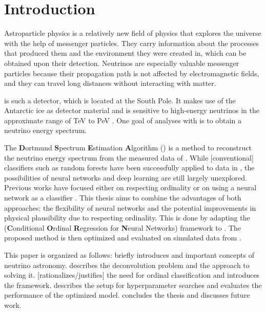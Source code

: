 \chapter{Introduction}
Astroparticle physics is a relatively new field of physics
  that explores the universe
    with the help of messenger particles.
They carry information about
    the processes that produced them
    and the environment they were created in,
  which can be obtained upon their detection.
Neutrinos are especially valuable messenger particles
  because their propagation path is not affected by electromagnetic fields,
  and they can travel long distances without interacting with matter.


\icecube{} is such a detector,
  which is located at the South Pole.
It makes use of the Antarctic ice as detector material
  and is sensitive to high-energy neutrinos
    in the approximate range of \si{\tera\electronvolt} to \si{\peta\electronvolt} \cite{icecube_aartsen}.
%
One goal of analyses with \icecube{} is
  to obtain a neutrino energy spectrum.

The \textbf{D}ortmund \textbf{S}pectrum \textbf{E}stimation \textbf{A}lgorithm (\dsea{}) \cite{dsea_unification}
is a method to reconstruct the neutrino energy spectrum
  from the measured data of \icecube{}.
While [conventional] classifiers %
  such as random forests
have been successfully applied to \icecube{} data in \dsea{},
the possibilities of neural networks and deep learning are still largely unexplored. %
%
Previous works
have focused either
  on respecting ordinality \cite{dsea_jan} %
  or on using a neural network as a classifier \cite{dsea_samuel}.
This thesis aims to combine the advantages of both approaches:
  the flexibility of neural networks
  and the potential improvements in physical plausibility
    due to respecting ordinality.
This is done by adapting the
\corn{} (\textbf{C}onditional \textbf{O}rdinal \textbf{R}egression for \textbf{N}eural Networks) framework \cite{corn}
to \dsea{}.
The proposed method is then optimized and evaluated
  on simulated data from \icecube{}.

This paper is organized as follows:
 briefly introduces \icecube{} and important concepts of neutrino astronomy.
 describes the deconvolution problem and the \dsea{} approach to solving it.
 [rationalizes/justifies] the need for ordinal classification and introduces the \corn{} framework.
 describes the setup for hyperparameter searches and evaluates the performance of the optimized model.
 concludes the thesis and discusses future work.
